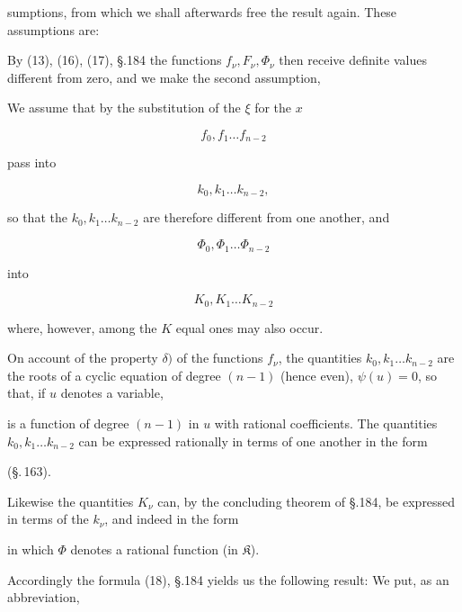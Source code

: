 sumptions, from which we shall afterwards free the result again.
These assumptions are:


By (13), (16), (17), §.184 the functions $f_\nu, F_\nu,
\Phi_\nu$ then receive definite values different from zero, and we make
the second assumption,


We assume that by the substitution of the $\xi$ for the $x$

\[
f_0, f_1 \ldots f_{n-2}
\]

pass into

\[
k_0, k_1 \ldots k_{n-2},
\]

so that the $k_0, k_1 \ldots k_{n-2}$ are therefore different from one
another, and

\[
\Phi_0, \Phi_1 \ldots \Phi_{n-2}
\]

into

\[
K_0, K_1 \ldots K_{n-2}
\]

where, however, among the $K$ equal ones may also occur.

On account of the property $\delta)$ of the functions $f_\nu$, the
quantities $k_0, k_1 \ldots k_{n-2}$ are the roots of a cyclic equation
of degree $(n-1)$ (hence even), $\psi(u) = 0$, so that, if $u$ denotes a
variable,


is a function of degree $(n-1)$ in $u$ with rational coefficients. The
quantities $k_0, k_1 \ldots k_{n-2}$ can be expressed rationally in
terms of one another in the form

(§.\,163).

Likewise the quantities $K_\nu$ can, by the concluding theorem of
§.184, be expressed in terms of the $k_\nu$, and indeed in the form


in which $\Phi$ denotes a rational function (in $\mathfrak{K}$).

Accordingly the formula (18), §.184 yields us the following result: We
put, as an abbreviation,

